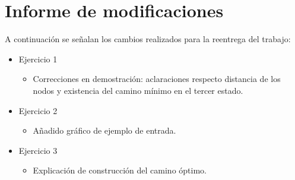 \section*{Informe de modificaciones}

A continuación se señalan los cambios realizados para la reentrega del trabajo:

\begin{itemize}
	\item{
		Ejercicio 1
		\begin{itemize}
			\item{Correcciones en demostración: aclaraciones respecto distancia
				de los nodos y existencia del camino mínimo en el tercer estado.}
		\end{itemize}
	}
	\item{
		Ejercicio 2
		\begin{itemize}
			\item{Añadido gráfico de ejemplo de entrada.}
		\end{itemize}
	}
	\item{
		Ejercicio 3
		\begin{itemize}
			\item{Explicación de construcción del camino óptimo.}
		\end{itemize}
	}
\end{itemize}
